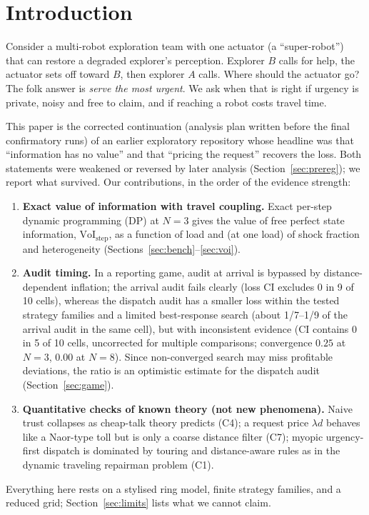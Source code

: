 \documentclass[10pt]{article}
\begin{document}
\section{Introduction}
Consider a multi-robot exploration team with one actuator (a ``super-robot'') that can restore a degraded explorer's perception. Explorer $B$ calls for help, the actuator sets off toward $B$, then explorer $A$ calls. Where should the actuator go? The folk answer is \emph{serve the most urgent}. We ask when that is right if urgency is private, noisy and free to claim, and if reaching a robot costs travel time.

This paper is the corrected continuation (analysis plan written before the final confirmatory runs) of an earlier exploratory repository whose headline was that ``information has no value'' and that ``pricing the request'' recovers the loss. Both statements were weakened or reversed by later analysis (Section~\ref{sec:prereg}); we report what survived. Our contributions, in the order of the evidence strength:
\begin{enumerate}
\item \textbf{Exact value of information with travel coupling.} Exact per-step dynamic programming (DP) at $N=3$ gives the value of free perfect state information, $\mathrm{VoI}_{\text{step}}$, as a function of load and (at one load) of shock fraction and heterogeneity (Sections~\ref{sec:bench}--\ref{sec:voi}).
\item \textbf{Audit timing.} In a reporting game, audit at arrival is bypassed by distance-dependent inflation; the arrival audit fails clearly (loss CI excludes $0$ in 9 of 10 cells), whereas the dispatch audit has a smaller loss within the tested strategy families and a limited best-response search (about 1/7--1/9 of the arrival audit in the same cell), but with inconsistent evidence (CI contains $0$ in 5 of 10 cells, uncorrected for multiple comparisons; convergence $0.25$ at $N{=}3$, $0.00$ at $N{=}8$). Since non-converged search may miss profitable deviations, the ratio is an optimistic estimate for the dispatch audit (Section~\ref{sec:game}).
\item \textbf{Quantitative checks of known theory (not new phenomena).} Naive trust collapses as cheap-talk theory predicts (C4); a request price $\lambda d$ behaves like a Naor-type toll but is only a coarse distance filter (C7); myopic urgency-first dispatch is dominated by touring and distance-aware rules as in the dynamic traveling repairman problem (C1).
\end{enumerate}
Everything here rests on a stylised ring model, finite strategy families, and a reduced grid; Section~\ref{sec:limits} lists what we cannot claim.
\end{document}
